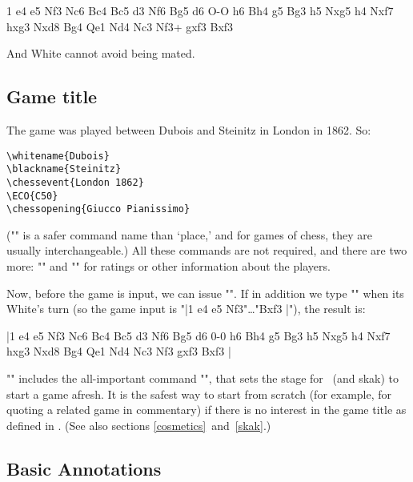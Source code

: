 \documentclass[12pt]{ltxdoc}
\begin{document}
\begin{texmate}
1 e4 e5 Nf3 Nc6 Bc4 Bc5 d3 Nf6 Bg5 d6 O-O h6 Bh4 g5 Bg3 h5 Nxg5 h4 Nxf7 hxg3 Nxd8 Bg4 Qe1 Nd4 Nc3 Nf3+ gxf3 Bxf3
\end{texmate}

And White cannot avoid being mated.

\subsection{Game title}\label{markup}

The game was played between Dubois and Steinitz in London in 1862. So:

\begin{verbatim}
\whitename{Dubois}
\blackname{Steinitz}
\chessevent{London 1862}
\ECO{C50}
\chessopening{Giucco Pianissimo}
\end{verbatim}

\SpecialIndex{\whitename}\SpecialIndex{\blackname}\SpecialIndex{\ECO}\SpecialIndex{\chessopening}
\SpecialIndex{\chessevent}
\DescribeMacro{\welo}\DescribeMacro{\belo}("\chessevent" is a safer command name than `place,' and for games of chess, they are usually interchangeable.) All these commands are not required, and there are two more: "\welo" and "\belo" for ratings or other information about the players.


Now, before the game is input, we can issue \DescribeMacro{\makegametitle}"\makegametitle". If in addition we type \DescribeMacro{\resigns}"\resigns" when its White's turn (so the game input is \makebarother"|1 e4 e5 Nf3"\dots"Bxf3 \resigns|"), the result is:

\makebarchess
\makegametitle
|1 e4 e5 Nf3 Nc6 Bc4 Bc5 d3 Nf6 Bg5 d6 0-0 h6 Bh4 g5 Bg3 h5 Nxg5 h4 Nxf7 hxg3 Nxd8 Bg4 Qe1 Nd4 Nc3 Nf3 gxf3 Bxf3 \resigns|

\bigskip\noindent
\DescribeMacro{\newgame}"\makegametitle" includes the all-important command "\newgame", that sets the stage for \TeXmate\ (and \textsf{skak}) to start a game afresh. It is the safest way to start from scratch (for example, for quoting a related game in commentary) if there is no interest in the game title as defined in \TeXmate. (See also sections \ref{cosmetics}~and~\ref{skak}.)

\subsection{Basic Annotations}\label{annotation}
\end{document}
